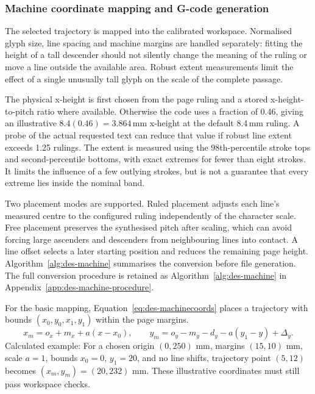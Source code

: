 \subsubsection{Machine coordinate mapping and G-code generation}
\label{sec:des-gcode}
The selected trajectory is mapped into the calibrated workspace. Normalised glyph size, line spacing and machine margins are handled separately: fitting the height of a tall descender should not silently change the meaning of the ruling or move a line outside the available area. Robust extent measurements limit the effect of a single unusually tall glyph on the scale of the complete passage.~\cite[style.py; synthesise.py; reproduce.py]{braunepipeline2026}


The physical x-height is first chosen from the page ruling and a stored x-height-to-pitch ratio where available. Otherwise the code uses a fraction of 0.46, giving an illustrative $8.4(0.46)=3.864$\,mm x-height at the default 8.4\,mm ruling. A probe of the actual requested text can reduce that value if robust line extent exceeds 1.25 rulings. The extent is measured using the 98th-percentile stroke tops and second-percentile bottoms, with exact extremes for fewer than eight strokes. It limits the influence of a few outlying strokes, but is not a guarantee that every extreme lies inside the nominal band.~\cite[style.py; synthesise.py; reproduce.py]{braunepipeline2026}

Two placement modes are supported. Ruled placement adjusts each line's measured centre to the configured ruling independently of the character scale. Free placement preserves the synthesised pitch after scaling, which can avoid forcing large ascenders and descenders from neighbouring lines into contact. A line offset selects a later starting position and reduces the remaining page height. Algorithm~\ref{alg:des-machine} summarises the conversion before file generation.
The full conversion procedure is retained as Algorithm~\ref{alg:des-machine} in Appendix~\ref{app:des-machine-procedure}.~\cite[style.py; synthesise.py]{braunepipeline2026}


For the basic mapping, Equation~\ref{eq:des-machinecoords} places a trajectory with bounds $(x_0,y_0,x_1,y_1)$ within the page margins.
\begin{equation}
x_m=o_x+m_x+a(x-x_0),\qquad
y_m=o_y-m_y-d_y-a(y_1-y)+\Delta_y.
\label{eq:des-machinecoords}
\end{equation}
Calculated example: For a chosen origin $(0,250)$ mm, margins $(15,10)$ mm, scale $a=1$, bounds $x_0=0$, $y_1=20$, and no line shifts, trajectory point $(5,12)$ becomes $(x_m,y_m)=(20,232)$ mm. These illustrative coordinates must still pass workspace checks. \cite[reproduce.py, ToMachine]{braunepipeline2026}

